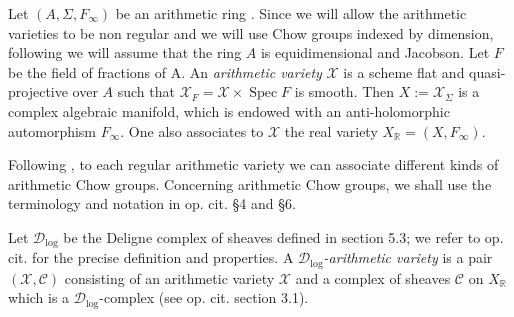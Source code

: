 \documentclass[10pt,twoside]{article}
\numberwithin{equation}{section}
\theoremstyle{plain}
\theoremstyle{definition}
\DeclareMathOperator{\Spec}{Spec}
\begin{document}
Let $(A,\Sigma ,F_{\infty})$ be an arithmetic ring
\cite{GilletSoule:ait}. Since we will allow the arithmetic varieties
to be non regular and we will use Chow groups indexed by dimension,
following \cite{GilletSoule:aRRt} we will assume that the ring $A$ is
equidimensional and Jacobson. Let $F$ be the field of fractions of A. 
An \textit{arithmetic variety} $\mathcal{X}$ is a scheme  
flat and quasi-projective over $A$ such that
$\mathcal{X}_{F}=\mathcal{X}\times \Spec F$ 
is smooth. 
 Then 
$X:=\mathcal{X}_{\Sigma }
$ is a
complex algebraic manifold, which is endowed with an
anti-holomorphic automorphism $F_{\infty}$. One also associates to
$\mathcal{X}$ the real variety 
$X_{\mathbb{R}}=(X,F_{\infty})$.  

Following \cite{BurgosKramerKuehn:cacg},  
to each regular arithmetic variety we can associate different kinds
of arithmetic Chow groups.
Concerning arithmetic Chow groups, we shall use the terminology and
notation in
op. cit.  \S 4 and \S 6.

Let $\mathcal{D}_{\log}$ be the Deligne complex of sheaves defined
in \cite{BurgosKramerKuehn:cacg} section 5.3; we refer to op. cit.
for the precise definition and properties. A
\textit{$\mathcal{D}_{\log}$-arithmetic variety} is a pair
$(\mathcal{X},\mathcal{C})$
consisting of an arithmetic variety $\mathcal{X}$ and a complex of
sheaves $\mathcal{C}$ on $X_{\mathbb{R}}$ which is a
$\mathcal{D}_{\log}$-complex (see op. cit. section 3.1).
\end{document}
